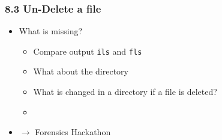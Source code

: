 \begin{frame}[fragile]
  \frametitle{8.3 Un-Delete a file}
  \begin{itemize}
    \item What is missing?
    \begin{itemize}
      \item Compare output \texttt{ils} and \texttt{fls}
      \item What about the directory
      \item What is changed in a directory if a file is deleted?
      \item[]
    \end{itemize}
    \item[] $\to$ Forensics Hackathon
  \end{itemize}
\end{frame}






